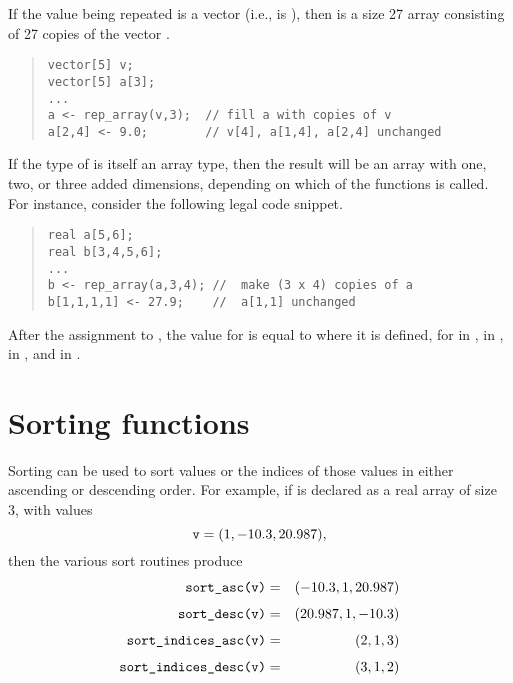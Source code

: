 If the value being repeated  is a vector (i.e.,  is
), then  is a size 27 array
consisting of 27 copies of the vector .
%
\begin{quote}
\begin{Verbatim}[fontsize=\small]
vector[5] v;
vector[5] a[3];
...
a <- rep_array(v,3);  // fill a with copies of v
a[2,4] <- 9.0;        // v[4], a[1,4], a[2,4] unchanged
\end{Verbatim}
\end{quote}

If the type  of  is itself an array type, then the
result will be an array with one, two, or three added dimensions,
depending on which of the  functions is called.  For
instance, consider the following legal code snippet.
%
\begin{quote}
\begin{Verbatim}[fontsize=\small]
real a[5,6];
real b[3,4,5,6];
...
b <- rep_array(a,3,4); //  make (3 x 4) copies of a
b[1,1,1,1] <- 27.9;    //  a[1,1] unchanged
\end{Verbatim}
\end{quote}
%
After the assignment to , the value for  is
equal to  where it is defined, for  in ,
 in ,  in , and  in
.

\section{Sorting functions}\label{sorting-functions.section}

Sorting can be used to sort values or the indices of those values in
either ascending or descending order.  For example, if  is
declared as a real array of size 3, with values
\[
\mbox{\code{v}} = (1, -10.3, 20.987),
\]
then the various sort routines produce
%
\begin{eqnarray*}
\mbox{\code{sort\_asc(v)}} & = &  (-10.3,1,20.987)
\\[4pt]
\mbox{\code{sort\_desc(v)}} & = &  (20.987,1,-10.3)
\\[4pt]
\mbox{\code{sort\_indices\_asc(v)}} & = &  (2,1,3)
\\[4pt]
\mbox{\code{sort\_indices\_desc(v)}} & = &  (3,1,2)
\end{eqnarray*}

